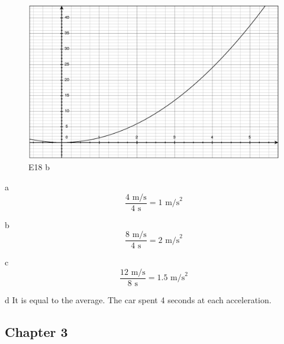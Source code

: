 \documentclass{exam}
\begin{document}
\begin{description}
\begin{figure}[H]
  \centering
  \includegraphics[scale=.3]{E18_b.eps}
  \caption*{E18 b}
\end{figure}


\item[SP2]
\begin{description*}
\item[a] 
\[
  \frac{4 \text{ m/s}}{4 \text{ s}} = 1 \text{ m/s}^2
\]

\item[b] 
\[
  \frac{8 \text{ m/s}}{4 \text{ s}} = 2 \text{ m/s}^2
\]

\item[c] 
\[
  \frac{12 \text{ m/s}}{8 \text{ s}} = 1.5 \text{ m/s}^2
\]

\item[d]
It is equal to the average.  The car spent 4 seconds at each acceleration.

\end{description*}

\end{description}

\subsection{Chapter 3}
\end{document}

